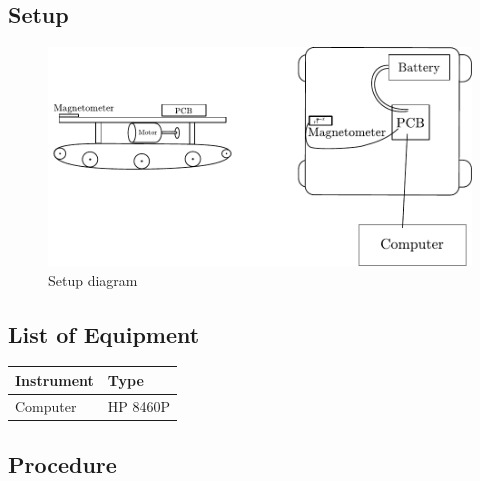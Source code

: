 \subsection{Setup}
\begin{figure}[H]
  \centering
  \includegraphics[scale=0.8]{figures/magnetoCalibSetup.pdf}
  \caption{Setup diagram}
  \label{fig:calibrationSetupDiagram}
\end{figure}
\subsection{List of Equipment}

\begin{table}[H]
\begin{tabular}{|p{10cm}|p{4cm}|}
\hline%
  \textbf{Instrument}                     &  \textbf{Type}       \\
\hline%
  Computer                                &  HP 8460P            \\
\hline %
\end{tabular}
\end{table}

\subsection{Procedure}

